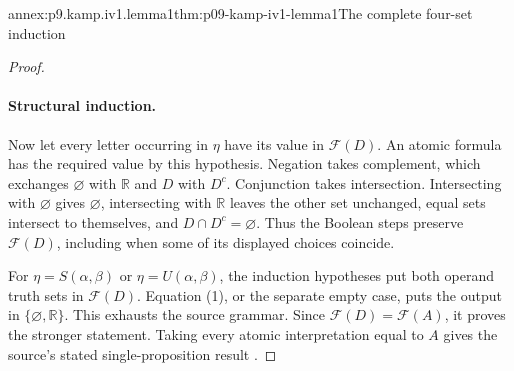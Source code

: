 \begin{annexitem}{annex:p9.kamp.iv1.lemma1}{thm:p09-kamp-iv1-lemma1}{The complete four-set induction}
\begin{proof}
\paragraph{Structural induction.}
Now let every letter occurring in \(\eta\) have its value in
\(\mathcal F(D)\). An atomic formula has the required value by
this hypothesis. Negation takes complement, which exchanges
\(\varnothing\) with \(\mathbb R\) and \(D\) with
\(D^c\). Conjunction takes intersection. Intersecting with
\(\varnothing\) gives \(\varnothing\), intersecting with
\(\mathbb R\) leaves the other set unchanged, equal sets
intersect to themselves, and \(D\cap D^c=\varnothing\).
Thus the Boolean steps preserve \(\mathcal F(D)\), including
when some of its displayed choices coincide.

For \(\eta=S(\alpha,\beta)\) or
\(\eta=U(\alpha,\beta)\), the induction hypotheses put
both operand truth sets in \(\mathcal F(D)\). Equation (1),
or the separate empty case, puts the output in
\(\{\varnothing,\mathbb R\}\). This exhausts the source
grammar. Since \(\mathcal F(D)=\mathcal F(A)\), it proves
the stronger statement. Taking every atomic interpretation equal
to \(A\) gives the source's stated single-proposition result
\cite[ch.~IV, lemma~1, pp.~96--97]{Kamp1968}.
\end{proof}
\end{annexitem}


